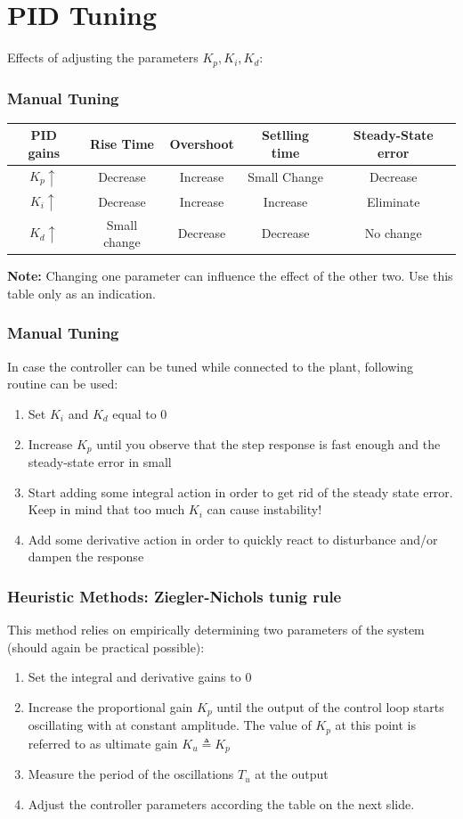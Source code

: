 \section{PID Tuning}

\begin{frame}
	Effects of adjusting the parameters $K_p, K_i, K_d$:
	\vspace{1em}
	\frametitle{Manual Tuning}
	{
	\small
	\begin{tabular}{c | c | c | c | c }
		PID gains	&	Rise Time 	&	Overshoot	&	Setlling time	&	Steady-State error \\
		\hline
		$K_p \uparrow$ & Decrease	&	Increase	&	Small Change	&	Decrease \\
		$K_i \uparrow$ & Decrease	&	Increase	&	Increase		&	Eliminate \\
		$K_d \uparrow$ & Small change &	Decrease	&	Decrease		&	No change \\
	\end{tabular}
	}
	\vspace{1em}
	
	\textbf{Note:} Changing one parameter can influence the effect of the other two. Use this table only as an indication.
\end{frame}

\begin{frame}
	\frametitle{Manual Tuning}
	In case the controller can be tuned while connected to the plant, following routine can be used:
	\begin{enumerate}
		\item Set $K_i$ and $K_d$ equal to 0
		\item Increase $K_p$ until you observe that the step response is fast enough and the steady-state error in small
		\item Start adding some integral action in order to get rid of the steady state error. Keep in mind that too much $K_i$ can cause instability!
		\item Add some derivative action in order to quickly react to disturbance and/or dampen the response
		
	\end{enumerate}
\end{frame}


\begin{frame}
	\frametitle{Heuristic Methods: Ziegler-Nichols tunig rule}
		This method relies on empirically determining two parameters of the system (should again be practical possible):
		\begin{enumerate}
			\item Set the integral and derivative gains to 0
			\item Increase the proportional gain $K_p$ until the output of the control loop starts oscillating with at constant amplitude. The value of $K_p$ at this point is referred to as ultimate gain $K_u \triangleq K_p$
			\item Measure the period of the oscillations $T_u$ at the output
			\item Adjust the controller parameters according the table on the next slide.
		\end{enumerate}
\end{frame}

